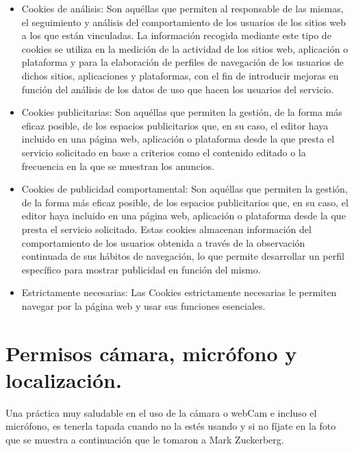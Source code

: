 \documentclass[
  a4paper,
  openany]{book}
\begin{document}
\begin{itemize}
\item
  Cookies de análisis: Son aquéllas que permiten al responsable de las mismas, el seguimiento y análisis del comportamiento de los usuarios de los sitios web a los que están vinculadas. La información recogida mediante este tipo de cookies se utiliza en la medición de la actividad de los sitios web, aplicación o plataforma y para la elaboración de perfiles de navegación de los usuarios de dichos sitios, aplicaciones y plataformas, con el fin de introducir mejoras en función del análisis de los datos de uso que hacen los usuarios del servicio.
\item
  Cookies publicitarias: Son aquéllas que permiten la gestión, de la forma más eficaz posible, de los espacios publicitarios que, en su caso, el editor haya incluido en una página web, aplicación o plataforma desde la que presta el servicio solicitado en base a criterios como el contenido editado o la frecuencia en la que se muestran los anuncios.
\item
  Cookies de publicidad comportamental: Son aquéllas que permiten la gestión, de la forma más eficaz posible, de los espacios publicitarios que, en su caso, el editor haya incluido en una página web, aplicación o plataforma desde la que presta el servicio solicitado. Estas cookies almacenan información del comportamiento de los usuarios obtenida a través de la observación continuada de sus hábitos de navegación, lo que permite desarrollar un perfil específico para mostrar publicidad en función del mismo.
\item
  Estrictamente necesarias: Las Cookies estrictamente necesarias le permiten navegar por la página web y usar sus funciones esenciales.
\end{itemize}

\hypertarget{permisos-cuxe1mara-micruxf3fono-y-localizaciuxf3n.}{%
\section{Permisos cámara, micrófono y localización.}\label{permisos-cuxe1mara-micruxf3fono-y-localizaciuxf3n.}}

Una práctica muy saludable en el uso de la cámara o webCam e incluso el micrófono, es tenerla tapada cuando no la estés usando y si no fíjate en la foto que se muestra a continuación que le tomaron a Mark Zuckerberg.
\end{document}
